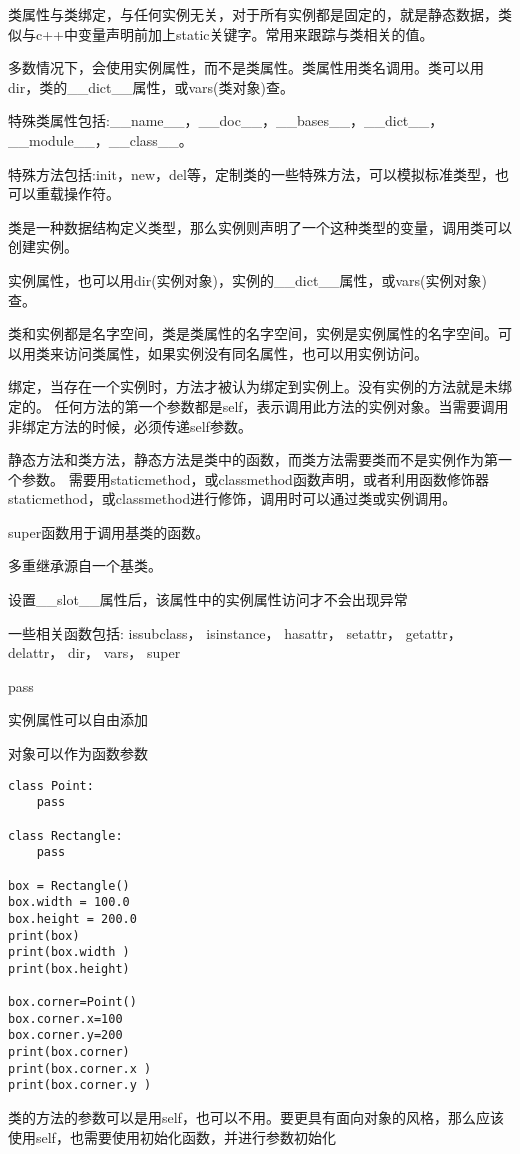 \documentclass[twoside,11pt]{book}
\begin{document}
类属性与类绑定，与任何实例无关，对于所有实例都是固定的，就是静态数据，类似与c++中变量声明前加上static关键字。常用来跟踪与类相关的值。

多数情况下，会使用实例属性，而不是类属性。类属性用类名调用。类可以用dir，类的\_\_dict\_\_属性，或vars(类对象)查。

特殊类属性包括:\_\_name\_\_，\_\_doc\_\_，\_\_bases\_\_，\_\_dict\_\_，\_\_module\_\_，\_\_class\_\_。

特殊方法包括:init，new，del等，定制类的一些特殊方法，可以模拟标准类型，也可以重载操作符。

类是一种数据结构定义类型，那么实例则声明了一个这种类型的变量，调用类可以创建实例。

实例属性，也可以用dir(实例对象)，实例的\_\_dict\_\_属性，或vars(实例对象)查。

类和实例都是名字空间，类是类属性的名字空间，实例是实例属性的名字空间。可以用类来访问类属性，如果实例没有同名属性，也可以用实例访问。

绑定，当存在一个实例时，方法才被认为绑定到实例上。没有实例的方法就是未绑定的。
任何方法的第一个参数都是self，表示调用此方法的实例对象。当需要调用非绑定方法的时候，必须传递self参数。

静态方法和类方法，静态方法是类中的函数，而类方法需要类而不是实例作为第一个参数。
需要用staticmethod，或classmethod函数声明，或者利用函数修饰器\@ staticmethod，或\@ classmethod进行修饰，调用时可以通过类或实例调用。

super函数用于调用基类的函数。

多重继承源自一个基类。

设置\_\_slot\_\_属性后，该属性中的实例属性访问才不会出现异常


一些相关函数包括:
issubclass，
isinstance，
hasattr，
setattr，
getattr，
delattr，
dir，
vars，
super




pass

实例属性可以自由添加

对象可以作为函数参数
\begin{lstlisting}
class Point:
    pass

class Rectangle:
    pass

box = Rectangle()
box.width = 100.0
box.height = 200.0
print(box)
print(box.width )
print(box.height)

box.corner=Point()
box.corner.x=100
box.corner.y=200
print(box.corner)
print(box.corner.x )
print(box.corner.y )
\end{lstlisting}

类的方法的参数可以是用self，也可以不用。要更具有面向对象的风格，那么应该使用self，也需要使用初始化函数，并进行参数初始化
\end{document}
